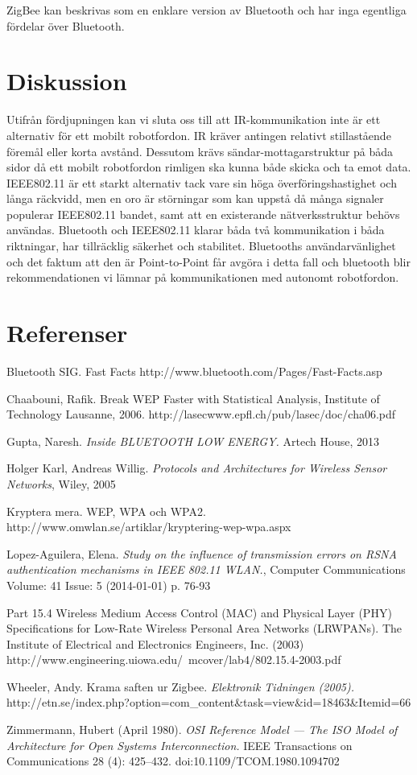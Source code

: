 \documentclass[a4paper,12pt,fleqn]{article}
\begin{document}
ZigBee kan beskrivas som en enklare version av Bluetooth och har inga egentliga fördelar över Bluetooth. 

\section{Diskussion}
Utifrån fördjupningen kan vi sluta oss till att IR-kommunikation inte är ett alternativ för ett mobilt robotfordon. IR kräver antingen relativt stillastående föremål eller korta avstånd. Dessutom krävs sändar-mottagarstruktur på båda sidor då ett mobilt robotfordon rimligen ska kunna både skicka och ta emot data.
IEEE802.11 är ett starkt alternativ tack vare sin höga överföringshastighet och långa räckvidd, men en oro är störningar som kan uppstå då många signaler populerar IEEE802.11 bandet, samt att en existerande nätverksstruktur behövs användas.
Bluetooth och IEEE802.11 klarar båda två kommunikation i båda riktningar, har tillräcklig säkerhet och stabilitet. Bluetooths användarvänlighet och det faktum att den är Point-to-Point får avgöra i detta fall och bluetooth blir rekommendationen vi lämnar på kommunikationen med autonomt robotfordon.

\newpage 
\section*{Referenser}

Bluetooth SIG. Fast Facts http://www.bluetooth.com/Pages/Fast-Facts.asp 

Chaabouni, Rafik. Break WEP Faster with Statistical Analysis, Institute of Technology Lausanne, 2006. http://lasecwww.epfl.ch/pub/lasec/doc/cha06.pdf

Gupta, Naresh. \emph{Inside BLUETOOTH LOW ENERGY.} Artech House, 2013

Holger Karl, Andreas Willig. \emph{Protocols and Architectures for Wireless Sensor Networks}, Wiley, 2005

Kryptera mera. WEP, WPA och WPA2. http://www.omwlan.se/artiklar/kryptering-wep-wpa.aspx 

Lopez-Aguilera, Elena. \emph{Study on the influence of transmission errors on RSNA authentication mechanisms in IEEE 802.11 WLAN.}, Computer Communications Volume: 41 Issue: 5 (2014-01-01) p. 76-93

Part 15.4 Wireless Medium Access Control (MAC) and Physical Layer (PHY) Specifications for Low-Rate Wireless Personal Area Networks (LR\text{-}WPANs). The Institute of Electrical and Electronics Engineers, Inc. (2003) \\ http://www.engineering.uiowa.edu/~mcover/lab4/802.15.4-2003.pdf

Wheeler, Andy. Krama saften ur Zigbee. \emph{Elektronik Tidningen (2005).} \\ http://etn.se/index.php?option=com\_content\&task=view\&id=18463\&Itemid=66

Zimmermann, Hubert (April 1980).\emph{ OSI Reference Model — The ISO Model of Architecture for Open Systems Interconnection.} IEEE Transactions on Communications 28 (4): 425–432. doi:10.1109/TCOM.1980.1094702
\end{document}
